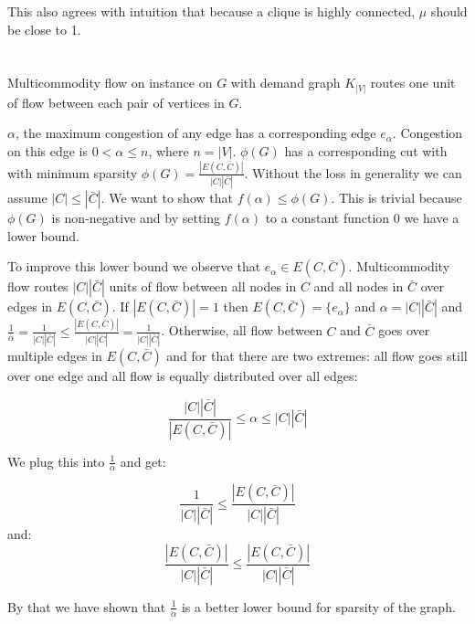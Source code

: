 \documentclass[a4paper,11pt,oneside,onecolumn]{article}
\begin{document}
This also agrees with intuition that because a clique is highly connected, $\mu$ should be close to 1.

\section{}

\section{}

Multicommodity flow on instance on $G$ with demand graph $K_{|V|}$ routes one unit of flow between each pair of vertices in $G$.

$\alpha$, the maximum congestion of any edge has a corresponding edge $e_\alpha$. Congestion on this edge is $0 < \alpha \le n$, where $n = |V|$. $\phi(G)$ has
a corresponding cut with with minimum sparsity $\phi(G) = \frac{|E(C,\bar C)|}{|C||\bar C|}$. Without the loss in generality we can assume $|C| \le |\bar C|$. We want to show that $f(\alpha) \le \phi(G)$. This is trivial because $\phi(G)$ is non-negative and by setting $f(\alpha)$ to a constant function $0$ we have a lower bound.

To improve this lower bound we observe that $e_\alpha \in E(C,\bar C)$. Multicommodity flow routes $|C||\bar C|$ units of flow between all nodes in $C$ and all nodes in $\bar C$ over edges in $E(C,\bar C)$. If $|E(C,\bar C)| = 1$ then $E(C,\bar C) = \{e_\alpha\} $ and $\alpha = |C||\bar C|$ and $\frac{1}{\alpha} = \frac{1}{|C||\bar C|} \le \frac{|E(C,\bar C)|}{|C||\bar C|} = \frac{1}{|C||\bar C|}$. Otherwise, all flow between $C$ and $\bar C$ goes over multiple edges in $E(C,\bar C)$ and for that there are two extremes: all flow goes still over one edge and all flow is equally distributed over all edges:

$$
\frac{|C||\bar C|}{|E(C,\bar C)|} \le \alpha \le |C||\bar C|
$$

We plug this into $\frac{1}{\alpha}$ and get:

$$
\frac{1}{|C||\bar C|} \le \frac{|E(C,\bar C)|}{|C||\bar C|}
$$
and:
$$
\frac{|E(C,\bar C)|}{|C||\bar C|} \le \frac{|E(C,\bar C)|}{|C||\bar C|}
$$

By that we have shown that $\frac{1}{\alpha}$ is a better lower bound
for sparsity of the graph.
\end{document}

